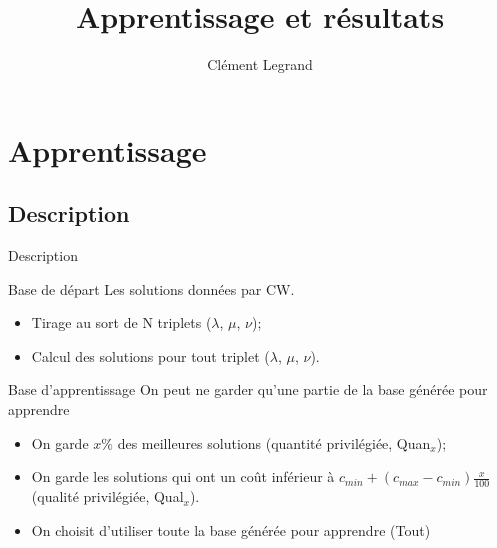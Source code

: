 \documentclass{beamer}
\title{Apprentissage et résultats}
\author{Clément Legrand}
\begin{document}
\footnotesize

\begin{frame}[plain]
\titlepage
\end{frame}

\section{Apprentissage}

\subsection{Description}

\begin{frame}{Description}
\begin{block}{Base de départ}
Les solutions données par CW.
\begin{itemize}
\item Tirage au sort de N triplets ($\lambda$, $\mu$, $\nu$);
\item Calcul des solutions pour tout triplet ($\lambda$, $\mu$, $\nu$).
\end{itemize}
\end{block}

\begin{block}{Base d'apprentissage}
On peut ne garder qu'une partie de la base générée pour apprendre
\begin{itemize}
\item On garde $x\%$ des meilleures solutions (quantité privilégiée, Quan$_{x}$);
\item On garde les solutions qui ont un coût inférieur à $c_{min} + (c_{max}-c_{min})\frac{x}{100}$ (qualité privilégiée, Qual$_{x}$).
\item On choisit d'utiliser toute la base générée pour apprendre (Tout)
\end{itemize}
\end{block}
\end{frame}
\end{document}
